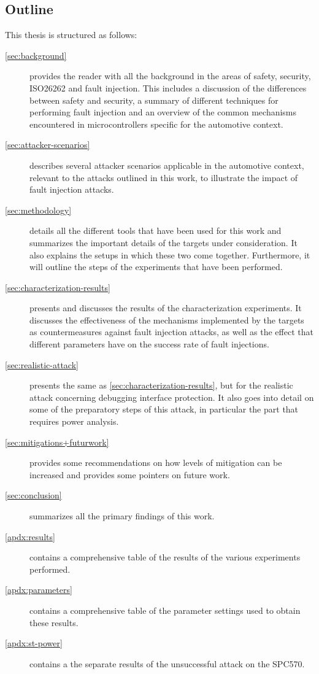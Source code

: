\documentclass[10pt]{article}
\newcommand{\ST}{SPC570\xspace}
\begin{document}
  


  \newpage
  \subsection{Outline }

    This thesis is structured as follows:

    \begin{description}
      \item[\autoref{sec:background}] provides the reader with all the background in the areas of safety, security, ISO26262 and fault injection. This includes a discussion of the differences between safety and security, a summary of different techniques for performing fault injection and an overview of the common mechanisms encountered in microcontrollers specific for the automotive context.
      \item[\autoref{sec:attacker-scenarios}] describes several attacker scenarios applicable in the automotive context, relevant to the attacks outlined in this work, to illustrate the impact of fault injection attacks. 
      \item[\autoref{sec:methodology}] details all the different tools that have been used for this work and summarizes the important details of the targets under consideration. It also explains the setups in which these two come together. Furthermore, it will outline the steps of the experiments that have been performed.
      \item[\autoref{sec:characterization-results}] presents and discusses the results of the characterization experiments. It discusses the effectiveness of the mechanisms implemented by the targets as countermeasures against fault injection attacks, as well as the effect that different parameters have on the success rate of fault injections.
      \item[\autoref{sec:realistic-attack}] presents the same as \autoref{sec:characterization-results}, but for the realistic attack concerning debugging interface protection. It also goes into detail on some of the preparatory steps of this attack, in particular the part that requires power analysis.
      \item[\autoref{sec:mitigations+futurwork}] provides some recommendations on how levels of mitigation can be increased and provides some pointers on future work.
      \item[\autoref{sec:conclusion}] summarizes all the primary findings of this work.
    \end{description}
    \vfill
    \begin{description}
      \item[\autoref{apdx:results}] contains a comprehensive table of the results of the various experiments performed.
      \item[\autoref{apdx:parameters}] contains a comprehensive table of the parameter settings used to obtain these results.
      \item[\autoref{apdx:st-power}] contains a the separate results of the unsuccessful attack on the \ST.
    \end{description}
\end{document}
